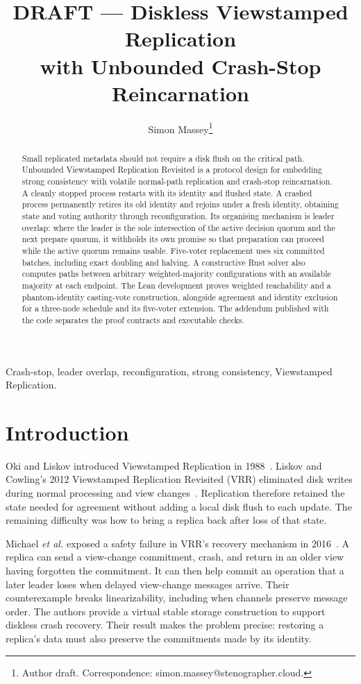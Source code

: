 \documentclass[10pt,journal,letterpaper]{IEEEtran}
\title{DRAFT --- Diskless Viewstamped Replication\\with Unbounded Crash-Stop Reincarnation}
\author{Simon Massey\thanks{Author draft. Correspondence: simon.massey@stenographer.cloud.}}
\begin{document}
\maketitle
\thispagestyle{fancy}

\begin{abstract}
Small replicated metadata should not require a disk flush on the critical path.
Unbounded Viewstamped Replication Revisited is a protocol design for embedding
strong consistency with volatile normal-path replication and crash-stop
reincarnation.
A cleanly stopped process restarts with its identity and flushed state.
A crashed process permanently retires its old identity and rejoins under a fresh
identity, obtaining state and voting authority through reconfiguration.
Its organising mechanism is leader overlap: where the leader is the sole
intersection of the active decision quorum and the next prepare quorum, it
withholds its own promise so that preparation can proceed while the active
quorum remains usable.
Five-voter replacement uses six committed batches, including exact doubling
and halving. A constructive Rust solver also computes paths between arbitrary
weighted-majority configurations with an available majority at each endpoint.
The Lean development proves weighted reachability and a phantom-identity
casting-vote construction, alongside agreement and identity exclusion for a
three-node schedule and its five-voter extension. The addendum published
with the code separates the proof contracts and executable checks.
\end{abstract}

\begin{IEEEkeywords}
Crash-stop, leader overlap, reconfiguration, strong consistency, Viewstamped Replication.
\end{IEEEkeywords}

\section{Introduction}\label{sec:intro}
Oki and Liskov introduced Viewstamped Replication in 1988~\cite{vr}.
Liskov and Cowling's 2012 Viewstamped Replication Revisited (VRR) eliminated
disk writes during normal processing and view changes~\cite{vrr}.
Replication therefore retained the state needed for agreement without adding a
local disk flush to each update. The remaining difficulty was how to bring a
replica back after loss of that state.

Michael \emph{et al.} exposed a safety failure in VRR's recovery mechanism in
2016~\cite[Sec.~4.2 and Appendix~A.1]{diskless}.
A replica can send a view-change commitment, crash, and return in an older view
having forgotten the commitment.
It can then help commit an operation that a later leader loses when delayed
view-change messages arrive.
Their counterexample breaks linearizability, including when channels preserve
message order.
The authors provide a virtual stable storage construction to support diskless
crash recovery.
Their result makes the problem precise: restoring a replica's data must also
preserve the commitments made by its identity.
\end{document}
